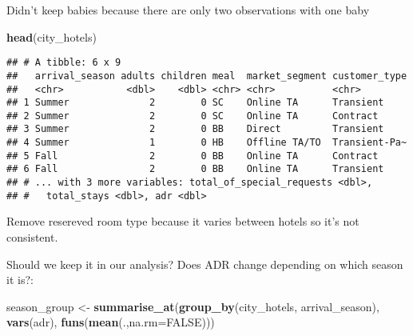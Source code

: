 \documentclass[]{article}
\newenvironment{Shaded}{\begin{snugshade}}{\end{snugshade}}
\newcommand{\CommentTok}[1]{\textcolor[rgb]{0.56,0.35,0.01}{\textit{#1}}}
\newcommand{\DataTypeTok}[1]{\textcolor[rgb]{0.13,0.29,0.53}{#1}}
\newcommand{\KeywordTok}[1]{\textcolor[rgb]{0.13,0.29,0.53}{\textbf{#1}}}
\newcommand{\NormalTok}[1]{#1}
\newcommand{\OperatorTok}[1]{\textcolor[rgb]{0.81,0.36,0.00}{\textbf{#1}}}
\newcommand{\OtherTok}[1]{\textcolor[rgb]{0.56,0.35,0.01}{#1}}
\newcommand{\StringTok}[1]{\textcolor[rgb]{0.31,0.60,0.02}{#1}}
\begin{document}
\begin{Shaded}
\end{Shaded}

Didn't keep babies because there are only two observations with one baby

\begin{Shaded}
\begin{Highlighting}[]
\KeywordTok{head}\NormalTok{(city_hotels)}
\end{Highlighting}
\end{Shaded}

\begin{verbatim}
## # A tibble: 6 x 9
##   arrival_season adults children meal  market_segment customer_type
##   <chr>           <dbl>    <dbl> <chr> <chr>          <chr>        
## 1 Summer              2        0 SC    Online TA      Transient    
## 2 Summer              2        0 SC    Online TA      Contract     
## 3 Summer              2        0 BB    Direct         Transient    
## 4 Summer              1        0 HB    Offline TA/TO  Transient-Pa~
## 5 Fall                2        0 BB    Online TA      Contract     
## 6 Fall                2        0 BB    Online TA      Transient    
## # ... with 3 more variables: total_of_special_requests <dbl>,
## #   total_stays <dbl>, adr <dbl>
\end{verbatim}

Remove resereved room type because it varies between hotels so it's not
consistent.

Should we keep it in our analysis? Does ADR change depending on which
season it is?:

\begin{Shaded}
\begin{Highlighting}[]
\NormalTok{season_group <-}\StringTok{ }\KeywordTok{summarise_at}\NormalTok{(}\KeywordTok{group_by}\NormalTok{(city_hotels, arrival_season), }\KeywordTok{vars}\NormalTok{(adr), }\KeywordTok{funs}\NormalTok{(}\KeywordTok{mean}\NormalTok{(.,}\DataTypeTok{na.rm=}\OtherTok{FALSE}\NormalTok{)))}
\end{Highlighting}
\end{Shaded}
\end{document}
